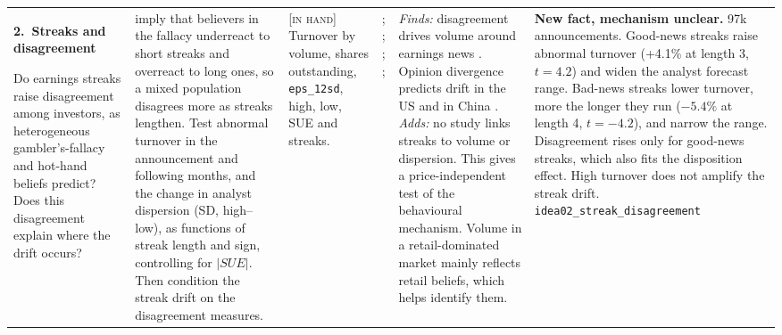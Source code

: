 \documentclass[10pt]{article}
\newcommand{\idea}[2]{\textbf{#1.\ #2}\par\smallskip}
\newcommand{\inhand}{\textsc{[in hand]}}
\begin{document}
{\begin{longtable}{@{}L{3.2cm}L{4.4cm}L{2.5cm}L{3.0cm}L{5.4cm}L{5.8cm}@{}}
\idea{2}{Streaks and disagreement}
Do earnings streaks raise disagreement among investors, as heterogeneous gambler's-fallacy and hot-hand beliefs
predict? Does this disagreement explain where the drift occurs?
&
\citet{rabin2010} imply that believers in the fallacy underreact to short streaks and overreact to long ones, so a
mixed population disagrees more as streaks lengthen. Test abnormal turnover in the announcement and following months,
and the change in analyst dispersion (SD, high--low), as functions of streak length and sign, controlling for $|SUE|$.
Then condition the streak drift on the disagreement measures.
&
\inhand{} Turnover by volume, shares outstanding, \texttt{eps\_12sd}, high, low, SUE and streaks.
&
\citet{kandel1995}; \citet{garfinkel2006}; \citet{shu2022}; \citet{rabin2010}; \citet{loh2012}
&
\emph{Finds:} disagreement drives volume around earnings news \citep{kandel1995}. Opinion divergence predicts drift
in the US \citep{garfinkel2006} and in China \citep{shu2022}. \emph{Adds:} no study links streaks to volume or
dispersion. This gives a price-independent test of the behavioural mechanism. Volume in a retail-dominated market
mainly reflects retail beliefs, which helps identify them.
&
\textbf{New fact, mechanism unclear.} 97k announcements. Good-news streaks raise abnormal turnover (+4.1\% at length 3, $t=4.2$) and widen the analyst forecast range. Bad-news streaks lower turnover, more the longer they run ($-5.4\%$ at length 4, $t=-4.2$), and narrow the range. Disagreement rises only for good-news streaks, which also fits the disposition effect. High turnover does not amplify the streak drift. \texttt{idea02\_streak\_disagreement}\\[4pt]


\end{longtable}}
\end{document}
